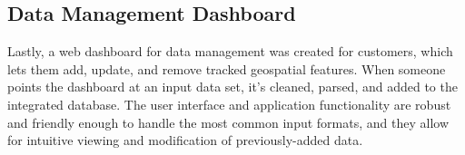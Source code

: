 \subsection{Data Management Dashboard}
Lastly, a web dashboard for data management was created for customers, which lets them add, update, and remove tracked geospatial features. When someone points the dashboard at an input data set, it's cleaned, parsed, and added to the integrated database. The user interface and application functionality are robust and friendly enough to handle the most common input formats, and they allow for intuitive viewing and modification of previously-added data.
